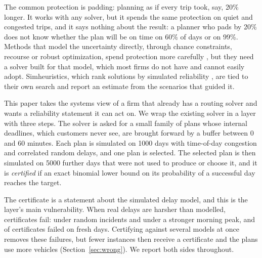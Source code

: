 \documentclass[11pt,a4paper]{article}
\theoremstyle{remark}
\begin{document}
The common protection is padding: planning as if every trip took, say, 20\% longer.
It works with any solver, but it spends the same protection on quiet and congested
trips, and it says nothing about the result: a planner who pads by 20\% does not know whether
the plan will be on time on 60\% of days or on 99\%. Methods that model the
uncertainty directly, through chance constraints, recourse or robust optimization,
spend protection more carefully
\citep{laporte1992,li2010,errico2018,agra2013,ehmke2015}, but they need a solver
built for that model, which most firms do not have and cannot easily adopt. Simheuristics,
which rank solutions by simulated reliability \citep{juan2015}, are tied to their own
search and report an estimate from the scenarios that guided it.

This paper takes the systems view of a firm that already has a routing solver and
wants a reliability statement it can act on. We wrap the existing solver in a
layer with three steps. The solver is asked for a small family of plans whose
internal deadlines, which customers never see, are brought forward by a buffer
between 0 and 60 minutes. Each plan is simulated on 1000 days with time-of-day
congestion and correlated random delays, and one plan is selected. The selected
plan is then simulated on 5000 further days that were not used to produce or
choose it, and it is \emph{certified} if an exact binomial lower bound on its
probability of a successful day reaches the target.

The certificate is a statement about the simulated delay model, and this is the
layer's main vulnerability. When real delays are harsher than modelled, certificates
fail: under random incidents and under a stronger morning peak, \WrIncFailed{} and
\WrPeakFailed{} of \WrIncCert{} certificates failed on fresh days. Certifying against
several models at once removes these failures, but fewer instances then receive a
certificate and the plans use more vehicles (Section~\ref{sec:wrong}). We report both
sides throughout.
\end{document}
